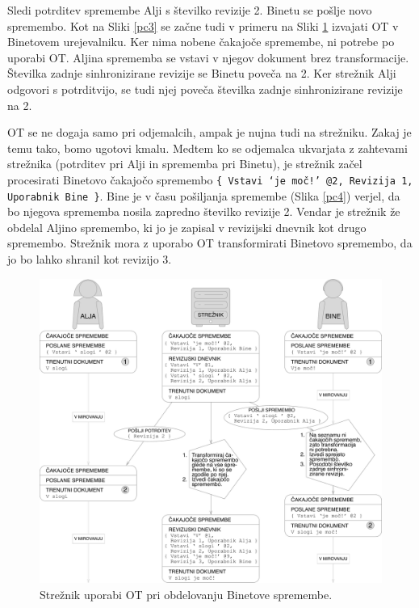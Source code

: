 \documentclass[a4paper, 12pt, twoside]{book}
\begin{document}
Sledi potrditev spremembe Alji s številko revizije 2. Binetu se pošlje novo spremembo. Kot na Sliki \ref{pc3} se začne tudi v primeru na Sliki \ref{pc5} izvajati OT v Binetovem urejevalniku. Ker nima nobene čakajoče spremembe, ni potrebe po uporabi OT. Aljina sprememba se vstavi v njegov dokument brez transformacije. Številka zadnje sinhronizirane revizije se Binetu poveča na 2. Ker strežnik Alji odgovori s potrditvijo, se tudi njej poveča številka zadnje sinhronizirane revizije na 2.

\pagebreak

OT se ne dogaja samo pri odjemalcih, ampak je nujna tudi na strežniku. Zakaj je temu tako, bomo ugotovi kmalu. Medtem ko se odjemalca ukvarjata z zahtevami strežnika (potrditev pri Alji in sprememba pri Binetu), je strežnik začel procesirati \linebreak Binetovo čakajočo spremembo {\tt \{ Vstavi ‘je moč!’ @2, Revizija 1, Uporabnik \linebreak Bine \}}. Bine je v času pošiljanja spremembe (Slika \ref{pc4}) verjel, da bo njegova sprememba nosila zapredno številko revizije 2. Vendar je strežnik že obdelal Aljino spremembo, ki jo je zapisal v revizijski dnevnik kot drugo spremembo. Strežnik mora z uporabo OT transformirati Binetovo spremembo, da jo bo lahko shranil kot revizijo 3.

\begin{figure}[placement h]
\begin{center}
\includegraphics[width=16cm]{img/pc5.pdf}
\end{center}
\caption{Strežnik uporabi OT pri obdelovanju Binetove spremembe.}
\label{pc5}
\end{figure}
\end{document}
